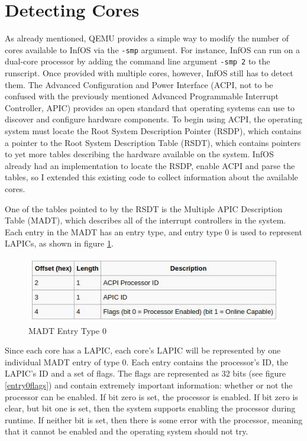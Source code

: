 \documentclass[bsc,frontabs,singlespacing,parskip,deptreport]{infthesis}
\begin{document}
\section{Detecting Cores} \label{detecting-cores}
As already mentioned, QEMU provides a simple way to modify the number of cores available to InfOS via the \verb|-smp| argument. For instance, InfOS can run on a dual-core processor by adding the command line argument \verb|-smp 2| to the runscript. Once provided with multiple cores, however, InfOS still has to detect them. The Advanced Configuration and Power Interface (ACPI, not to be confused with the previously mentioned Advanced Programmable Interrupt Controller, APIC) provides an open standard that operating systems can use to discover and configure hardware components. To begin using ACPI, the operating system must locate the Root System Description Pointer (RSDP), which contains a pointer to the Root System Description Table (RSDT), which contains pointers to yet more tables describing the hardware available on the system. InfOS already had an implementation to locate the RSDP, enable ACPI and parse the tables, so I extended this existing code to collect information about the available cores. 

One of the tables pointed to by the RSDT is the Multiple APIC Description Table (MADT), which describes all of the interrupt controllers in the system. Each entry in the MADT has an entry type, and entry type 0 is used to represent LAPICs, as shown in figure \ref{madtentry0}. 

\begin{figure}[h]
    \centering
    \includegraphics[scale=0.7]{madtentry0.jpg}
    \caption{MADT Entry Type 0 \cite{osdev-madt}}
    \label{madtentry0}
\end{figure}

Since each core has a LAPIC, each core's LAPIC will be represented by one individual MADT entry of type 0. Each entry contains the processor's ID, the LAPIC's ID and a set of flags. The flags are represented as 32 bits (see figure \ref{entry0flags}) and contain extremely important information: whether or not the processor can be enabled. If bit zero is set, the processor is enabled. If bit zero is clear, but bit one is set, then the system supports enabling the processor during runtime. If neither bit is set, then there is some error with the processor, meaning that it cannot be enabled and the operating system should not try.
\end{document}
